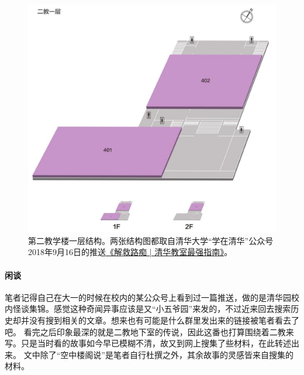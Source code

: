 \begin{figure}[!t]
	\centering
	\includegraphics[width=\linewidth]{figures/二教一层.jpg}
	第二教学楼一层结构。两张结构图都取自清华大学“学在清华”公众号2018年9月16日的推送\href{https://mp.weixin.qq.com/s/SHW-wviq3NYemcHZBRgi5w}{《解救路痴 | 清华教室最强指南》}。
\end{figure}

\vfill

\paragraph{闲谈}
笔者记得自己在大一的时候在校内的某公众号上看到过一篇推送，做的是清华园校内怪谈集锦。感觉这种奇闻异事应该是又“小五爷园”来发的，不过近来回去搜索历史却并没有搜到相关的文章。想来也有可能是什么群里发出来的链接被笔者看去了吧。
看完之后印象最深的就是二教地下室的传说，因此这番也打算围绕着二教来写。只是当时看的故事如今早已模糊不清，故又到网上搜集了些材料，在此转述出来。
文中除了“空中楼阁说”是笔者自行杜撰之外，其余故事的灵感皆来自搜集的材料。

